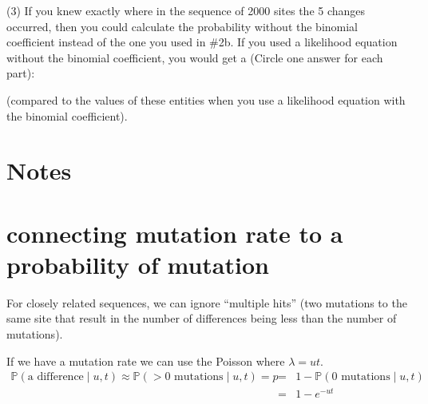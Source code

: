 \documentclass[11pt]{article}
\renewcommand{\Pr}{\mathbb{P}}
\begin{document}
(3) If you knew exactly where in the sequence of 2000 sites the 5 changes occurred, then
you could calculate the probability without the binomial coefficient instead of the one
you used in \#2b.
If you used a likelihood equation without the binomial coefficient, you would get a 
(Circle one answer for each part):
(compared to the values of these entities when you use a likelihood equation with the 
binomial coefficient).

\section*{Notes}

\section*{connecting mutation rate to a probability of mutation}
For closely related sequences, we can ignore ``multiple hits'' (two mutations to the same
site that result in the number of differences being less than the number of mutations).

If we have a mutation rate we can use the Poisson where $\lambda = ut$.
\begin{eqnarray*}
    \Pr(\mbox{a difference} \mid u, t) \approx \Pr(>0 \mbox{ mutations} \mid u, t) = p
    & = & 1 - \Pr(0 \mbox{ mutations} \mid u, t) \\
    & = & 1 - e^{- ut}
\end{eqnarray*}
\end{document}
